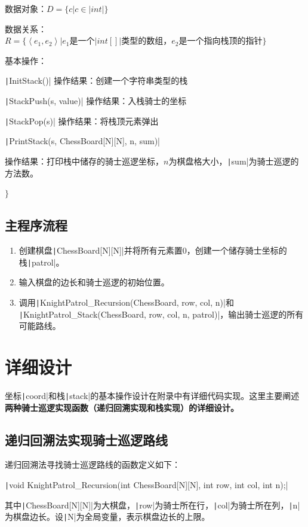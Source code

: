 \documentclass[10pt,a4paper]{article}
\begin{document}
	数据对象：$D=\{c | c\in \texttt|int|\}$
	
	数据关系：$R=\{ \left\langle e_1,e_2\right\rangle | e_1\text{是一个}\texttt|int[]|\text{类型的数组，}e_2\text{是一个指向栈顶的指针}\}$
	
	基本操作：
	
	\qquad \texttt|InitStack()| 操作结果：创建一个字符串类型的栈
	
	\qquad \texttt|StackPush(s, value)| 操作结果：入栈骑士的坐标
	
	\qquad \texttt|StackPop(s)| 操作结果：将栈顶元素弹出
	
	\qquad \texttt|PrintStack(s, ChessBoard[N][N], n, sum)|
	
	\qquad 操作结果：打印栈中储存的骑士巡逻坐标，$n$为棋盘格大小，\texttt|sum|为骑士巡逻的方法数。
	
	\noindent $\}$
	\subsection{主程序流程}
	\noindent
	\begin{enumerate}
		\item 创建棋盘\texttt|ChessBoard[N][N]|并将所有元素置0，创建一个储存骑士坐标的栈\texttt|patrol|。
		\item 输入棋盘的边长和骑士巡逻的初始位置。
		\item 调用\texttt|KnightPatrol_Recursion(ChessBoard, row, col, n)|和\\
		\texttt|KnightPatrol_Stack(ChessBoard, row, col, n, patrol)|，输出骑士巡逻的所有可能路线。
	\end{enumerate}
	\newpage
	\section{详细设计}
	\noindent 坐标\texttt|coord|和栈\texttt|stack|的基本操作设计在附录中有详细代码实现。这里主要阐述\textbf{两种骑士巡逻实现函数（递归回溯实现和栈实现）的详细设计。}
	\subsection{递归回溯法实现骑士巡逻路线}
	\noindent 递归回溯法寻找骑士巡逻路线的函数定义如下：
	\begin{center}
		\texttt|void KnightPatrol_Recursion(int ChessBoard[N][N], int row, int col, int n);|
	\end{center}
	其中\texttt|ChessBoard[N][N]|为大棋盘，\texttt|row|为骑士所在行，\texttt|col|为骑士所在列，\texttt|n|为棋盘边长。设\texttt|N|为全局变量，表示棋盘边长的上限。\\
\end{document}
